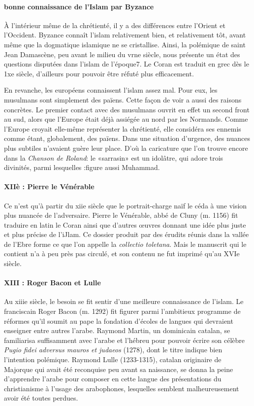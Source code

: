 \paragraph{bonne connaissance de l'Islam par Byzance}
À l'intérieur même de la chrétienté, il y a des différences entre
l'Orient et l'Occident. Byzance connaît l'islam relativement bien, et relativement tôt, avant même que la dogmatique islamique ne se cristallise. Ainsi, la polémique de saint Jean Damascène, peu avant le milieu du vrne siècle, nous présente un état des questions disputées dans l'islam de l'époque7. Le Coran est traduit en grec dès le 1xe siècle, d'ailleurs pour pouvoir être réfuté plus efficacement.

En revanche, les européens connaissent l'islam assez mal. Pour eux, les musulmans sont simplement des païens. Cette façon de voir a aussi des raisons concrètes. Le premier contact avec des musulmans ouvrit en effet un second front au sud, alors que l'Europe était
déjà assiégée au nord par les Normands. Comme l'Europe croyait elle-même représenter la chrétienté, elle considéra ses ennemis comme étant, globalement, des païens. Dans une situation d'urgence, des nuances plus subtiles n'avaient guère leur place. D'où la caricature que l'on trouve encore dans la \textit{Chanson de Roland}: le «sarrasin» est un idolâtre, qui adore trois divinités, parmi lesquelles :figure aussi Muhammad.

\paragraph{XIIè : Pierre le Vénérable}
Ce n'est qu'à partir du xiie siècle que le portrait-charge naïf le céda à une vision plus nuancée de l'adversaire. Pierre le Vénérable, abbé de Cluny (m. 1156) fit traduire en latin le Coran ainsi que d'autres œuvres donnant une idée plus juste et plus précise de l'iJlam. Ce dossier produit par des érudits réunis dans la vallée de l'Ebre forme ce que l'on appelle la \textit{collectio toletana}. Mais le manuscrit qui le contient n'a à peu près pas circulé, et son contenu ne fut imprimé qu'au XVIe siècle.
\paragraph{XIII : Roger Bacon  et Lulle}
Au xiiie siècle, le besoin se fit sentir d'une meilleure connaissance de l'islam. Le franciscain Roger Bacon (m. 1292) fit figurer parmi l'ambitieux programme de réformes qu'il soumit au pape la fondation d'écoles de langues qui devraient enseigner entre autres l'arabe. Raymond Martin, un dominicain catalan, se familiarisa suffisamment avec l'arabe et l'hébreu pour pouvoir écrire son célèbre \textit{Pugio fidei adversus mauros et judaeos} (1278), dont le titre indique bien l'intention polémique. Raymond Lulle (1233-1315), catalan originaire de Majorque qui avait été reconquise peu avant sa naissance, se donna la peine d'apprendre l'arabe pour composer en cette langue des présentations du christianisme à l'usage des arabophones, lesquelles semblent malheureusement avoir été toutes perdues.



